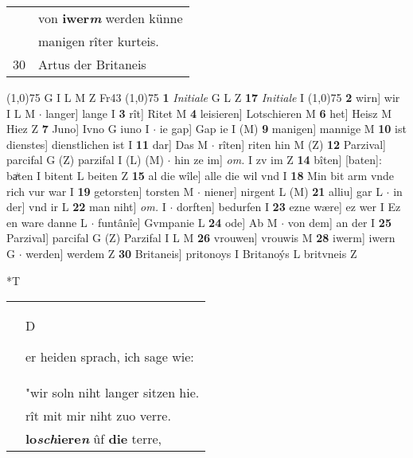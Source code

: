 \documentclass[8pt,a4paper,notitlepage]{article}
\begin{document}
\begin{table}[ht]
\begin{minipage}[t]{0.5\linewidth}
\begin{tabular}{rl}
 & von \textbf{iwer\textit{m}} werden künne\\ 
 & manigen rîter kurteis.\\ 
30 & Artus der Britaneis\\ 
\end{tabular}
\scriptsize
\line(1,0){75} \newline
G I L M Z Fr43 \newline
\line(1,0){75} \newline
\textbf{1} \textit{Initiale} G L Z  \textbf{17} \textit{Initiale} I  \newline
\line(1,0){75} \newline
\textbf{2} wirn] wir I L M  $\cdot$ langer] lange I \textbf{3} rît] Ritet M \textbf{4} leisieren] Lotschieren M \textbf{6} het] Heisz M Hiez Z \textbf{7} Juno] Ivno G iuno I  $\cdot$ ie gap] Gap ie I (M) \textbf{9} manigen] mannige M \textbf{10} ist dienstes] dienstlichen ist I \textbf{11} dar] Das M  $\cdot$ rîten] riten hin M (Z) \textbf{12} Parzival] parcifal G (Z) parzifal I (L) (M)  $\cdot$ hin ze im] \textit{om.} I zv im Z \textbf{14} bîten] [baten]: baͥten I bitent L beiten Z \textbf{15} al die wîle] alle die wil vnd I \textbf{18} Min bit arm vnde rich vur war I \textbf{19} getorsten] torsten M  $\cdot$ niener] nirgent L (M) \textbf{21} alliu] gar L  $\cdot$ in der] vnd ir L \textbf{22} man niht] \textit{om.} I  $\cdot$ dorften] bedurfen I \textbf{23} ezne wære] ez wer I Ez en ware danne L  $\cdot$ funtânîe] Gvmpanie L \textbf{24} ode] Ab M  $\cdot$ von dem] an der I \textbf{25} Parzival] parcifal G (Z) Parzifal I L M \textbf{26} vrouwen] vrouwis M \textbf{28} iwerm] iwern G  $\cdot$ werden] werdem Z \textbf{30} Britaneis] pritonoys I Britanoýs L britvneis Z \newline
\end{minipage}
\hspace{0.5cm}
\begin{minipage}[t]{0.5\linewidth}
\small
\begin{center}*T
\end{center}
\begin{tabular}{rl}
 & \begin{large}D\end{large}er heiden sprach, ich sage wie:\\ 
 & "wir soln niht langer sitzen hie.\\ 
 & rît mit mir niht zuo verre.\\ 
 & \textbf{lo\textit{sch}iere\textit{n}} ûf \textbf{die} terre,\\ 

\end{tabular}
\end{minipage}
\end{table}
\end{document}
